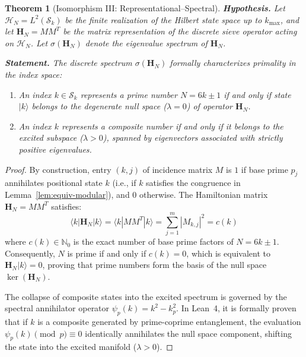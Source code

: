 \documentclass{article}
\numberwithin{equation}{section}
\theoremstyle{plain}
\newtheorem{theorem}{Theorem}[section]
\theoremstyle{definition}
\begin{document}
\begin{theorem}[Isomorphism III: Representational--Spectral]
\label{thm:iso-III}
\textbf{Hypothesis.} Let $\mathcal{H}_N = L^2(\mathcal{S}_k)$ be the finite realization of the Hilbert state space up to $k_{\max}$, and let $\mathbf{H}_N = M M^T$ be the matrix representation of the discrete sieve operator acting on $\mathcal{H}_N$. Let $\sigma(\mathbf{H}_N)$ denote the eigenvalue spectrum of $\mathbf{H}_N$.

\textbf{Statement.} The discrete spectrum $\sigma(\mathbf{H}_N)$ formally characterizes primality in the index space:
\begin{enumerate}
    \item An index $k \in \mathcal{S}_k$ represents a prime number $N = 6k \pm 1$ if and only if state $|k\rangle$ belongs to the degenerate null space ($\lambda = 0$) of operator $\mathbf{H}_N$.
    \item An index $k$ represents a composite number if and only if it belongs to the excited subspace ($\lambda > 0$), spanned by eigenvectors associated with strictly positive eigenvalues.
\end{enumerate}
\end{theorem}

\begin{proof}
By construction, entry $(k, j)$ of incidence matrix $M$ is $1$ if base prime $p_j$ annihilates positional state $k$ (i.e., if $k$ satisfies the congruence in Lemma~\ref{lem:equiv-modular}), and $0$ otherwise. The Hamiltonian matrix $\mathbf{H}_N = M M^T$ satisfies:
\begin{equation}
\langle k | \mathbf{H}_N | k \rangle = \langle k | M M^T | k \rangle = \sum_{j=1}^{m} |M_{k, j}|^2 = c(k)
\end{equation}
where $c(k) \in \mathbb{N}_0$ is the exact number of base prime factors of $N = 6k \pm 1$. Consequently, $N$ is prime if and only if $c(k) = 0$, which is equivalent to $\mathbf{H}_N |k\rangle = 0$, proving that prime numbers form the basis of the null space $\ker(\mathbf{H}_N)$.

The collapse of composite states into the excited spectrum is governed by the spectral annihilator operator $\psi_p(k) = k^2 - k_p^2$. In Lean~4, it is formally proven that if $k$ is a composite generated by prime-coprime entanglement, the evaluation $\psi_p(k) \pmod p \equiv 0$ identically annihilates the null space component, shifting the state into the excited manifold ($\lambda > 0$).
\end{proof}
\end{document}
